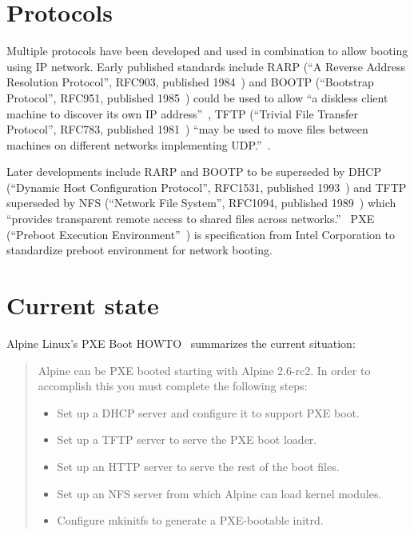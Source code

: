 \section{Protocols}

Multiple protocols have been developed and used in combination to
allow booting using IP network. Early published standards include RARP
(``A Reverse Address Resolution Protocol'', RFC903, published
1984~\cite{RFC903}) and BOOTP (``Bootstrap Protocol'', RFC951,
published 1985~\cite{RFC951}) could be used to allow ``a diskless
client machine to discover its own IP address''~\cite{RFC951}, TFTP
(``Trivial File Transfer Protocol'', RFC783, published
1981~\cite{RFC783}) ``may be used to move files between machines on
different networks implementing UDP.''~\cite{RFC783}.

Later developments include RARP and BOOTP to be superseded by DHCP
(``Dynamic Host Configuration Protocol'', RFC1531, published
1993~\cite{RFC1531}) and TFTP superseded by NFS (``Network File
System'', RFC1094, published 1989~\cite{RFC1094}) which ``provides
transparent remote access to shared files across
networks.''~\cite{RFC1094} PXE (``Preboot Execution
Environment''~\cite{PXEspec}) is specification from Intel Corporation
to standardize preboot environment for network booting.


\section{Current state}

Alpine Linux's PXE Boot HOWTO~\cite{alpine-pxe-boot-howto} summarizes
the current situation:

\begin{quote}
Alpine can be PXE booted starting with Alpine 2.6-rc2. In order to
accomplish this you must complete the following steps:

\begin{itemize}
\item Set up a DHCP server and configure it to support PXE boot.
\item Set up a TFTP server to serve the PXE boot loader.
\item Set up an HTTP server to serve the rest of the boot files.
\item Set up an NFS server from which Alpine can load kernel modules.
\item Configure mkinitfs to generate a PXE-bootable initrd.
\end{itemize}
\end{quote}

